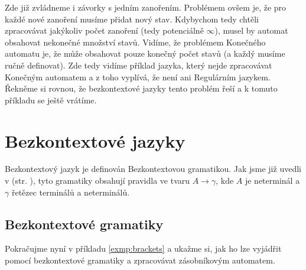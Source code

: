 \begin{exmp}
  Zde již zvládneme i závorky s jedním zanořením. Problémem ovšem je, že
  pro každé nové zanoření musíme přidat nový stav.
  Kdybychom tedy chtěli zpracovávat jakýkoliv počet zanoření (tedy potenciálně $\infty$),
  musel by automat obsahovat nekonečné množství stavů.
  Vidíme, že problémem Konečného automatu je, že může obsahovat pouze konečný
  počet stavů (a každý musíme ručně definovat).
  Zde tedy vidíme příklad jazyka, který nejde zpracovávat Konečným automatem
  a z toho vyplívá, že není ani Regulárním jazykem.
  Řekněme si rovnou, že bezkontextové jazyky tento problém řeší a k tomuto
  příkladu se ještě vrátíme.

\end{exmp}

\section{Bezkontextové jazyky}

Bezkontextový jazyk je definován Bezkontextovou gramatikou.
Jak jsme již uvedli v  (str. \pageref{chomsky:hierarchy}),
tyto gramatiky obsahují pravidla ve tvaru $A \rightarrow \gamma$, kde $A$ je neterminál a
$\gamma$ řetězec terminálů a neterminálů.

\subsection{Bezkontextové gramatiky}

Pokračujme nyní v příkladu \ref{exmp:brackets} a ukažme si, jak ho lze
vyjádřit pomocí bezkontextové gramatiky a zpracovávat zásobníkovým automatem.\\


